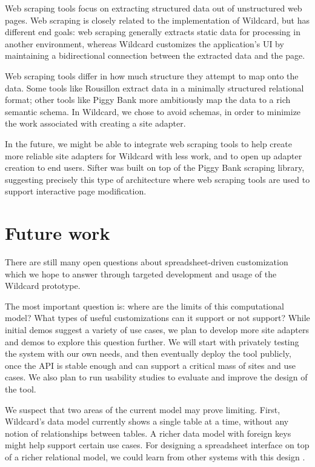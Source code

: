\documentclass[english,submission]{programming}
\begin{document}
Web scraping tools focus on extracting structured data out of
unstructured web pages. Web scraping is closely related to the
implementation of Wildcard, but has different end goals: web scraping
generally extracts static data for processing in another environment,
whereas Wildcard customizes the application's UI by maintaining a
bidirectional connection between the extracted data and the page.

Web scraping tools differ in how much structure they attempt to map onto
the data. Some tools like Rousillon \autocite{chasins2018} extract data
in a minimally structured relational format; other tools like Piggy Bank
\autocite{huynh2005} more ambitiously map the data to a rich semantic
schema. In Wildcard, we chose to avoid schemas, in order to minimize the
work associated with creating a site adapter.

In the future, we might be able to integrate web scraping tools to help
create more reliable site adapters for Wildcard with less work, and to
open up adapter creation to end users. Sifter was built on top of the
Piggy Bank scraping library, suggesting precisely this type of
architecture where web scraping tools are used to support interactive
page modification.

\hypertarget{future-work}{%
\section{Future work}\label{future-work}}

There are still many open questions about spreadsheet-driven
customization which we hope to answer through targeted development and
usage of the Wildcard prototype.

The most important question is: where are the limits of this
computational model? What types of useful customizations can it support
or not support? While initial demos suggest a variety of use cases, we
plan to develop more site adapters and demos to explore this question
further. We will start with privately testing the system with our own
needs, and then eventually deploy the tool publicly, once the API is
stable enough and can support a critical mass of sites and use cases. We
also plan to run usability studies to evaluate and improve the design of
the tool.

We suspect that two areas of the current model may prove limiting.
First, Wildcard's data model currently shows a single table at a time,
without any notion of relationships between tables. A richer data model
with foreign keys might help support certain use cases. For designing a
spreadsheet interface on top of a richer relational model, we could
learn from other systems with this design
\autocite{mccutchen2016,bakke2016}.
\end{document}
